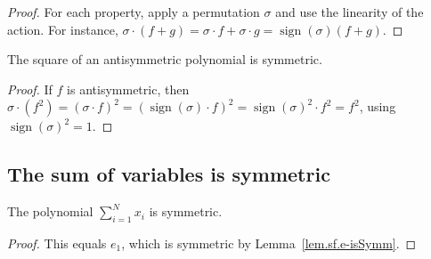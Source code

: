 \begin{proof}
\leanok
For each property, apply a permutation $\sigma$ and use the linearity of the action.
For instance, $\sigma \cdot (f + g) = \sigma \cdot f + \sigma \cdot g
= \operatorname{sign}(\sigma)(f + g)$.
\end{proof}

\begin{lemma}
\label{lem.sf.antisymm-sq-symmetric}
\leanhelper
\leanok
The square of an antisymmetric polynomial is symmetric.
\end{lemma}

\begin{proof}
\leanok
If $f$ is antisymmetric, then
$\sigma \cdot (f^2) = (\sigma \cdot f)^2 = (\operatorname{sign}(\sigma) \cdot f)^2
= \operatorname{sign}(\sigma)^2 \cdot f^2 = f^2$,
using $\operatorname{sign}(\sigma)^2 = 1$.
\end{proof}

\subsection{The sum of variables is symmetric}

\begin{lemma}
\label{lem.sf.sum-X-symmetric}
\leanhelper
\leanok
The polynomial $\sum_{i=1}^N x_i$ is symmetric.
\end{lemma}

\begin{proof}
\leanok
This equals $e_1$, which is symmetric by Lemma~\ref{lem.sf.e-isSymm}.
\end{proof}
